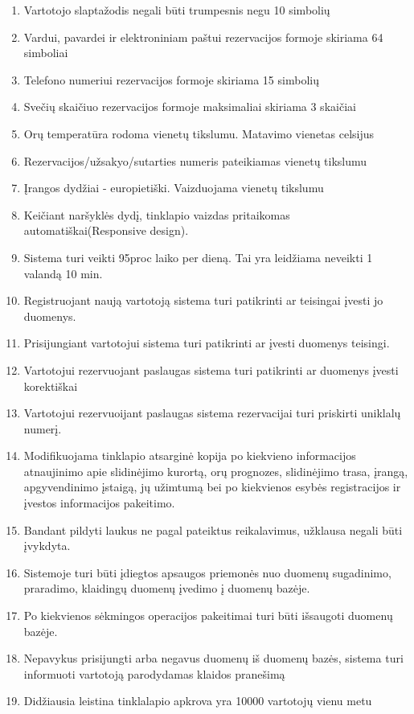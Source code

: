 \documentclass[oneside]{VUMIFPSkursinis}
\begin{document}
\begin{enumerate}
	\item Vartotojo slaptažodis negali būti trumpesnis negu 10 simbolių
	\item Vardui, pavardei ir elektroniniam paštui rezervacijos formoje skiriama 64 simboliai
	\item Telefono numeriui rezervacijos formoje skiriama 15 simbolių
	\item Svečių skaičiuo rezervacijos formoje maksimaliai skiriama 3 skaičiai
	\item Orų temperatūra rodoma vienetų tikslumu. Matavimo vienetas celsijus
	\item Rezervacijos/užsakyo/sutarties numeris pateikiamas vienetų tikslumu
	\item Įrangos dydžiai - europietiški. Vaizduojama vienetų tikslumu
	\item Keičiant naršyklės dydį, tinklapio vaizdas pritaikomas automatiškai(Responsive design).
	\item Sistema turi veikti 95proc laiko per dieną. Tai yra leidžiama neveikti 1 valandą 10 min.	
	\item Registruojant naują vartotoją sistema turi patikrinti ar teisingai įvesti jo duomenys.
	\item Prisijungiant vartotojui sistema turi patikrinti ar įvesti duomenys teisingi.
	\item Vartotojui rezervuojant paslaugas sistema turi patikrinti ar duomenys įvesti korektiškai
	\item Vartotojui rezervuoijant paslaugas sistema rezervacijai turi priskirti uniklalų numerį.
	\item Modifikuojama tinklapio atsarginė kopija po kiekvieno informacijos atnaujinimo apie slidinėjimo kurortą, orų prognozes, slidinėjimo trasa, įrangą, apgyvendinimo įstaigą, jų užimtumą bei po kiekvienos esybės registracijos ir įvestos informacijos pakeitimo.
	\item Bandant pildyti laukus ne pagal pateiktus reikalavimus, užklausa negali būti įvykdyta.
	\item Sistemoje turi būti įdiegtos apsaugos priemonės nuo duomenų sugadinimo, praradimo, klaidingų duomenų įvedimo į duomenų bazėje.
	\item Po kiekvienos sėkmingos operacijos pakeitimai turi būti išsaugoti duomenų bazėje.
	\item Nepavykus prisijungti arba negavus duomenų iš duomenų bazės, sistema turi informuoti vartotoją parodydamas klaidos pranešimą
	\item Didžiausia leistina tinklalapio apkrova yra 10000 vartotojų vienu metu

\end{enumerate}
\end{document}
